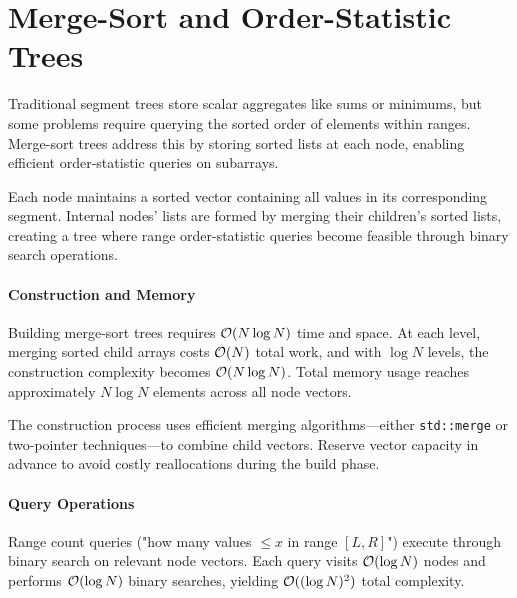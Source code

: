 
\section{Merge-Sort and Order-Statistic Trees}
\label{sec:merge_sort_trees}

Traditional segment trees store scalar aggregates like sums or minimums, but some problems require querying the sorted order of elements within ranges. Merge-sort trees address this by storing sorted lists at each node, enabling efficient order-statistic queries on subarrays.

Each node maintains a sorted vector containing all values in its corresponding segment. Internal nodes' lists are formed by merging their children's sorted lists, creating a tree where range order-statistic queries become feasible through binary search operations.

\paragraph{Construction and Memory}

Building merge-sort trees requires $\mathcal{O}(N \log N)$ time and space. At each level, merging sorted child arrays costs $\mathcal{O}(N)$ total work, and with $\log N$ levels, the construction complexity becomes $\mathcal{O}(N \log N)$. Total memory usage reaches approximately $N \log N$ elements across all node vectors.

The construction process uses efficient merging algorithms—either \texttt{std::merge} or two-pointer techniques—to combine child vectors. Reserve vector capacity in advance to avoid costly reallocations during the build phase.

\paragraph{Query Operations}

Range count queries ("how many values $\leq x$ in range $[L,R]$") execute through binary search on relevant node vectors. Each query visits $\mathcal{O}(\log N)$ nodes and performs $\mathcal{O}(\log N)$ binary searches, yielding $\mathcal{O}((\log N)^2)$ total complexity.

